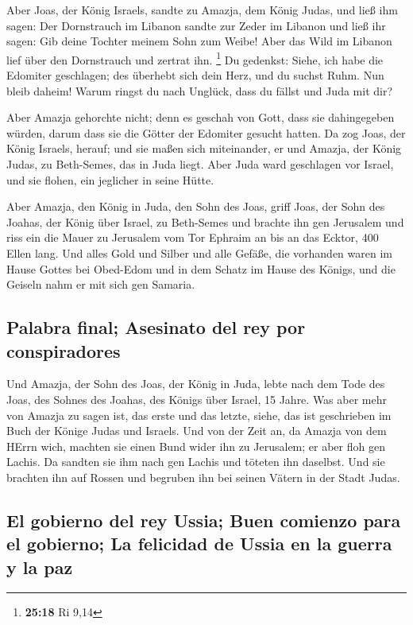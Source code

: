  Aber Joas, der König Israels, sandte zu Amazja, dem
König Judas, und ließ ihm sagen: Der Dornstrauch im Libanon sandte zur
Zeder im Libanon und ließ ihr sagen: Gib deine Tochter meinem Sohn zum
Weibe! Aber das Wild im Libanon lief über den Dornstrauch und zertrat
ihn. \footnote{\textbf{25:18} Ri 9,14}  Du gedenkst:
Siehe, ich habe die Edomiter geschlagen; des überhebt sich dein Herz,
und du suchst Ruhm. Nun bleib daheim! Warum ringst du nach Unglück, dass
du fällst und Juda mit dir?

 Aber Amazja gehorchte nicht; denn es geschah von Gott,
dass sie dahingegeben würden, darum dass sie die Götter der Edomiter
gesucht hatten.  Da zog Joas, der König Israels, herauf;
und sie maßen sich miteinander, er und Amazja, der König Judas, zu
Beth-Semes, das in Juda liegt.  Aber Juda ward geschlagen
vor Israel, und sie flohen, ein jeglicher in seine Hütte.

 Aber Amazja, den König in Juda, den Sohn des Joas, griff
Joas, der Sohn des Joahas, der König über Israel, zu Beth-Semes und
brachte ihn gen Jerusalem und riss ein die Mauer zu Jerusalem vom Tor
Ephraim an bis an das Ecktor, 400 Ellen lang.  Und alles
Gold und Silber und alle Gefäße, die vorhanden waren im Hause Gottes bei
Obed-Edom und in dem Schatz im Hause des Königs, und die Geiseln nahm er
mit sich gen Samaria.

\hypertarget{palabra-final-asesinato-del-rey-por-conspiradores}{%
\subsection{Palabra final; Asesinato del rey por
conspiradores}\label{palabra-final-asesinato-del-rey-por-conspiradores}}

 Und Amazja, der Sohn des Joas, der König in Juda, lebte
nach dem Tode des Joas, des Sohnes des Joahas, des Königs über Israel,
15 Jahre.  Was aber mehr von Amazja zu sagen ist, das
erste und das letzte, siehe, das ist geschrieben im Buch der Könige
Judas und Israels.  Und von der Zeit an, da Amazja von
dem HErrn wich, machten sie einen Bund wider ihn zu Jerusalem; er aber
floh gen Lachis. Da sandten sie ihm nach gen Lachis und töteten ihn
daselbst.  Und sie brachten ihn auf Rossen und begruben
ihn bei seinen Vätern in der Stadt Judas.

\hypertarget{el-gobierno-del-rey-ussia-buen-comienzo-para-el-gobierno-la-felicidad-de-ussia-en-la-guerra-y-la-paz}{%
\subsection{El gobierno del rey Ussia; Buen comienzo para el gobierno;
La felicidad de Ussia en la guerra y la
paz}\label{el-gobierno-del-rey-ussia-buen-comienzo-para-el-gobierno-la-felicidad-de-ussia-en-la-guerra-y-la-paz}}


